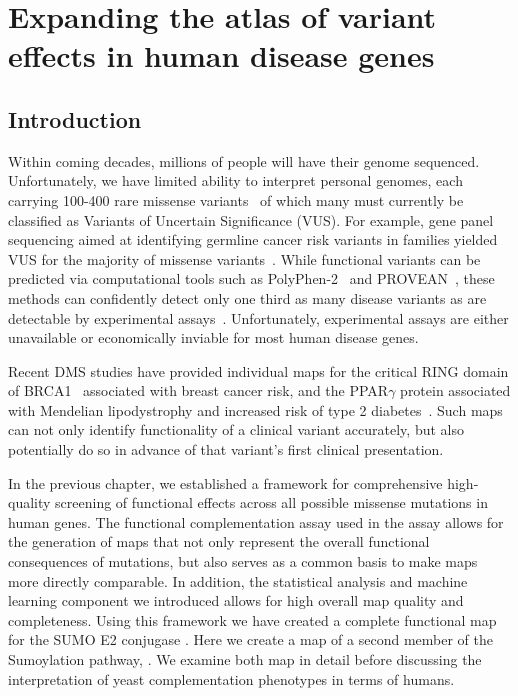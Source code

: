 
\chapter[Expanding the atlas of human disease variants]{Expanding the atlas of variant effects in human disease genes}
\label{ch:data2}

\section{Introduction}

Within coming decades, millions of people will have their genome sequenced. Unfortunately, we have limited ability to interpret personal genomes, each carrying 100-400 rare missense variants~\cite{the_1000_genomes_project_consortium_global_2015} of which many must currently be classified as Variants of Uncertain Significance (VUS). For example, gene panel sequencing aimed at identifying germline cancer risk variants in families yielded VUS for the majority of missense variants~\cite{maxwell_evaluation_2016}. While functional variants can be predicted via computational tools such as PolyPhen-2~\cite{adzhubei_predicting_2001} and PROVEAN~\cite{choi_predicting_2012}, these methods can confidently detect only one third as many disease variants as are detectable by experimental assays~\cite{sun_extended_2016}. Unfortunately, experimental assays are either unavailable or economically inviable for most human disease genes. 

Recent DMS studies have provided individual maps for the critical RING domain of BRCA1~\cite{starita_massively_2015} associated with breast cancer risk, and the PPAR$\gamma$ protein associated with Mendelian lipodystrophy and increased risk of type 2 diabetes~\cite{majithia_prospective_2016}. Such maps can not only identify functionality of a clinical variant accurately, but also potentially do so in advance of that variant's first clinical presentation. 

In the previous chapter, we established a framework for comprehensive high-quality screening of functional effects across all possible missense mutations in human genes. The functional complementation assay used in the assay allows for the generation of maps that not only represent the overall functional consequences of mutations, but also serves as a common basis to make maps more directly comparable. In addition, the statistical analysis and machine learning component we introduced allows for high overall map quality and completeness. Using this framework we have created a complete functional map for the SUMO E2 conjugase . Here we create a map of a second member of the Sumoylation pathway, . We examine both map in detail before discussing the interpretation of yeast complementation phenotypes in terms of humans. 

